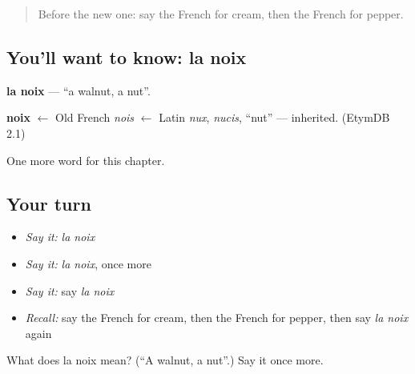 \label{lesson:FR-C72-noix}



\begin{quote}
Before the new one: say the French for cream, then the French for pepper.
\end{quote}

\subsection*{You'll want to know: la noix}
\textbf{la noix} — \textquotedblleft{}a walnut, a nut\textquotedblright{}.

\begin{cousinweb}
\textbf{noix} $\leftarrow$ Old French \emph{nois} $\leftarrow$ Latin \emph{nux}, \emph{nucis}, \textquotedblleft{}nut\textquotedblright{} — inherited. (EtymDB 2.1)
\end{cousinweb}

\begin{grammarlens}[title={What you've built}]
One more word for this chapter.
\end{grammarlens}

\subsection*{Your turn}
\begin{itemize}
\raggedright
  \item \emph{Say it:} \emph{la noix}
  \item \emph{Say it:} \emph{la noix}, once more
  \item \emph{Say it:} say \emph{la noix}
  \item \emph{Recall:} say the French for cream, then the French for pepper, then say \emph{la noix} again
\end{itemize}

\begin{tcolorbox}[breakable,colback=teal!4,colframe=teal!35!black,title={Before you move on}]
What does la noix mean? (\textquotedblleft{}A walnut, a nut\textquotedblright{}.) Say it once more.
\end{tcolorbox}
